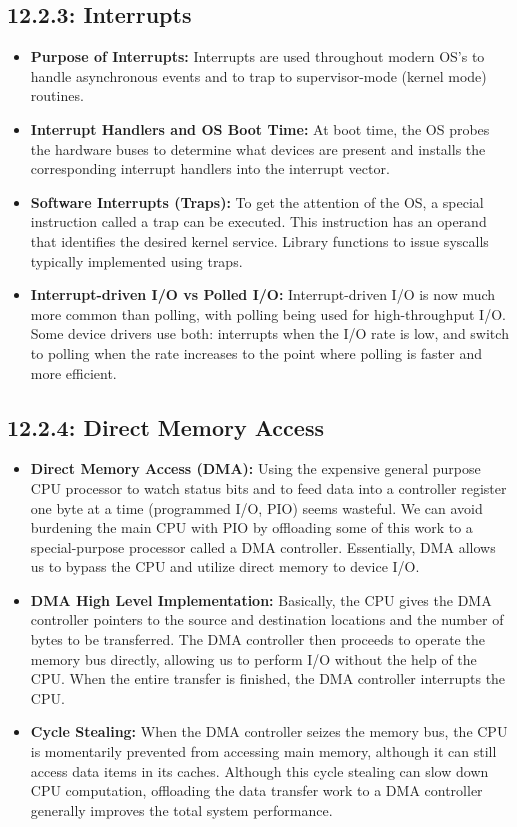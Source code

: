 \documentclass[12pt]{article}
\begin{document}
\subsection*{12.2.3: Interrupts}

\begin{itemize}
    \item \textbf{Purpose of Interrupts:} Interrupts are used throughout modern OS's to handle asynchronous events and to trap to supervisor-mode (kernel mode) routines.
    \item \textbf{Interrupt Handlers and OS Boot Time:} At boot time, the OS probes the hardware buses to determine what devices are present and installs the corresponding interrupt handlers into the interrupt vector.
    \item \textbf{Software Interrupts (Traps):} To get the attention of the OS, a special instruction called a trap can be executed. This instruction has an operand that identifies the desired kernel service. Library functions to issue syscalls typically implemented using traps.
    \item \textbf{Interrupt-driven I/O vs Polled I/O:} Interrupt-driven I/O is now much more common than polling, with polling being used for high-throughput I/O. Some device drivers use both: interrupts when the I/O rate is low, and switch to polling when the rate increases to the point where polling is faster and more efficient.
\end{itemize}

\subsection*{12.2.4: Direct Memory Access}

\begin{itemize}
    \item \textbf{Direct Memory Access (DMA):} Using the expensive general purpose CPU processor to watch status bits and to feed data into a controller register one byte at a time (programmed I/O, PIO) seems wasteful. We can avoid burdening the main CPU with PIO by offloading some of this work to a special-purpose processor called a DMA controller. Essentially, DMA allows us to bypass the CPU and utilize direct memory to device I/O.
    \item \textbf{DMA High Level Implementation:} Basically, the CPU gives the DMA controller pointers to the source and destination locations and the number of bytes to be transferred. The DMA controller then proceeds to operate the memory bus directly, allowing us to perform I/O without the help of the CPU. When the entire transfer is finished, the DMA controller interrupts the CPU.
    \item \textbf{Cycle Stealing:} When the DMA controller seizes the memory bus, the CPU is momentarily prevented from accessing main memory, although it can still access data items in its caches. Although this cycle stealing can slow down CPU computation, offloading the data transfer work to a DMA controller generally improves the total system performance.
\end{itemize}
\end{document}

